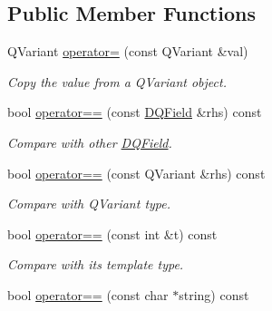 \subsection*{Public Member Functions}
\begin{DoxyCompactItemize}
\item 
\hypertarget{classDQPrimaryKey_a27d90ef68fdf2e78d848e01f1b1ddae5}{
QVariant \hyperlink{classDQPrimaryKey_a27d90ef68fdf2e78d848e01f1b1ddae5}{operator=} (const QVariant \&val)}
\label{classDQPrimaryKey_a27d90ef68fdf2e78d848e01f1b1ddae5}

\begin{DoxyCompactList}\small\item\em Copy the value from a QVariant object. \item\end{DoxyCompactList}\item 
\hypertarget{classDQField_af97b044232c392fb2798a9c04d4b2c40}{
bool \hyperlink{classDQField_af97b044232c392fb2798a9c04d4b2c40}{operator==} (const \hyperlink{classDQField}{DQField} \&rhs) const}
\label{classDQField_af97b044232c392fb2798a9c04d4b2c40}

\begin{DoxyCompactList}\small\item\em Compare with other \hyperlink{classDQField}{DQField}. \item\end{DoxyCompactList}\item 
\hypertarget{classDQField_acec82d17afefbf25d64f4d46bf404429}{
bool \hyperlink{classDQField_acec82d17afefbf25d64f4d46bf404429}{operator==} (const QVariant \&rhs) const}
\label{classDQField_acec82d17afefbf25d64f4d46bf404429}

\begin{DoxyCompactList}\small\item\em Compare with QVariant type. \item\end{DoxyCompactList}\item 
\hypertarget{classDQField_a239949c5298e739f37717652a326317b}{
bool \hyperlink{classDQField_a239949c5298e739f37717652a326317b}{operator==} (const int \&t) const}
\label{classDQField_a239949c5298e739f37717652a326317b}

\begin{DoxyCompactList}\small\item\em Compare with its template type. \item\end{DoxyCompactList}\item 
\hypertarget{classDQField_a77d0bd4973c3b15fcb352ce58f371394}{
bool \hyperlink{classDQField_a77d0bd4973c3b15fcb352ce58f371394}{operator==} (const char $\ast$string) const}
\label{classDQField_a77d0bd4973c3b15fcb352ce58f371394}


\end{DoxyCompactItemize}

